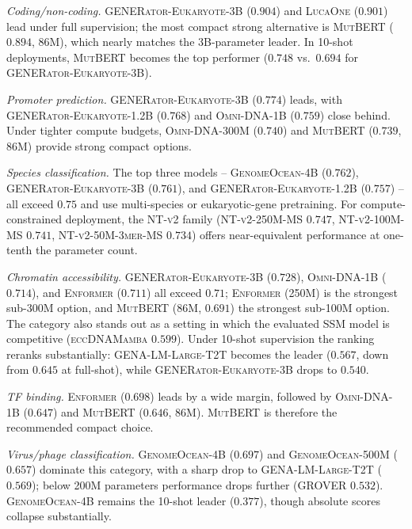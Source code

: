 \documentclass{llmxive}
\begin{document}
\textit{Coding/non-coding.} \textsc{GENERator-Eukaryote-3B} ($0.904$)
and \textsc{LucaOne} ($0.901$) lead under full supervision; the most
compact strong alternative is \textsc{MutBERT} ($0.894$, 86M), which
nearly matches the 3B-parameter leader. In 10-shot deployments,
\textsc{MutBERT} becomes the top performer ($0.748$ vs.\ $0.694$ for
\textsc{GENERator-Eukaryote-3B}).

\textit{Promoter prediction.} \textsc{GENERator-Eukaryote-3B}
($0.774$) leads, with \textsc{GENERator-Eukaryote-1.2B} ($0.768$) and
\textsc{Omni-DNA-1B} ($0.759$) close behind. Under tighter compute
budgets, \textsc{Omni-DNA-300M} ($0.740$) and \textsc{MutBERT}
($0.739$, 86M) provide strong compact options.

\textit{Species classification.} The top three models -- %
\textsc{GenomeOcean-4B} ($0.762$), \textsc{GENERator-Eukaryote-3B}
($0.761$), and \textsc{GENERator-Eukaryote-1.2B} ($0.757$) -- all
exceed $0.75$ and use multi-species or eukaryotic-gene pretraining.
For compute-constrained deployment, the \textsc{NT-v2} family
(\textsc{NT-v2-250M-MS} $0.747$, \textsc{NT-v2-100M-MS} $0.741$,
\textsc{NT-v2-50M-3mer-MS} $0.734$) offers near-equivalent performance
at one-tenth the parameter count.

\textit{Chromatin accessibility.} \textsc{GENERator-Eukaryote-3B}
($0.728$), \textsc{Omni-DNA-1B} ($0.714$), and \textsc{Enformer}
($0.711$) all exceed $0.71$; \textsc{Enformer} (250M) is the strongest
sub-300M option, and \textsc{MutBERT} (86M, $0.691$) the strongest
sub-100M option. The category also stands out as a setting in which
the evaluated SSM model is competitive (\textsc{eccDNAMamba} $0.599$).
Under 10-shot supervision the ranking reranks substantially:
\textsc{GENA-LM-Large-T2T} becomes the leader ($0.567$, down from
$0.645$ at full-shot), while \textsc{GENERator-Eukaryote-3B} drops
to $0.540$.

\textit{TF binding.} \textsc{Enformer} ($0.698$) leads by a wide
margin, followed by \textsc{Omni-DNA-1B} ($0.647$) and \textsc{MutBERT}
($0.646$, 86M). \textsc{MutBERT} is therefore the recommended compact
choice.

\textit{Virus/phage classification.} \textsc{GenomeOcean-4B}
($0.697$) and \textsc{GenomeOcean-500M} ($0.657$) dominate this
category, with a sharp drop to \textsc{GENA-LM-Large-T2T}
($0.569$); below 200M parameters performance drops further
(\textsc{GROVER} $0.532$). \textsc{GenomeOcean-4B} remains the
10-shot leader ($0.377$), though absolute scores collapse
substantially.
\end{document}
